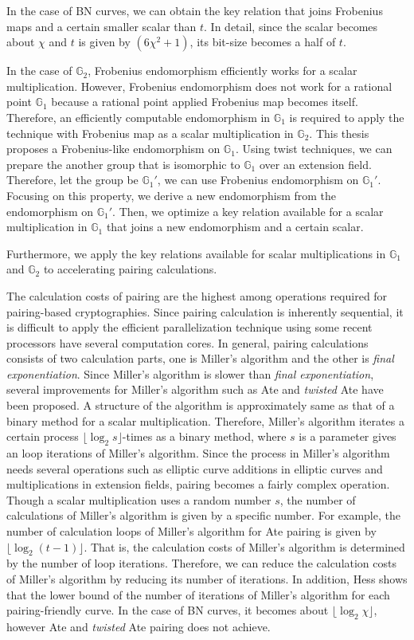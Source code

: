 In the case of BN curves, we can obtain the key relation that joins Frobenius maps and a certain smaller scalar than $t$.
In detail, since the scalar becomes about $\chi$ and $t$ is given by $(6\chi^2+1)$, its bit-size becomes a half of $t$.
 
In the case of $\mathbb{G}_2$, Frobenius endomorphism efficiently works for a scalar multiplication.
However, Frobenius endomorphism does not work for a rational point $\mathbb{G}_1$ because a rational point applied Frobenius map becomes itself.
Therefore, an efficiently computable endomorphism in $\mathbb{G}_1$ is required to apply the technique with Frobenius map as a scalar multiplication in $\mathbb{G}_2$.
This thesis proposes a Frobenius-like endomorphism on $\mathbb{G}_1$.
Using twist techniques, we can prepare the another group that is isomorphic to $\mathbb{G}_1$ over an extension field. 
Therefore, let the group be $\mathbb{G}_1'$, we can use Frobenius endomorphism on $\mathbb{G}_1'$.
Focusing on this property, we derive a new endomorphism from the endomorphism on $\mathbb{G}_1'$.
Then, we optimize a key relation available for a scalar multiplication in $\mathbb{G}_1$ that joins a new endomorphism and a certain scalar.
  
Furthermore, we apply the key relations available for scalar multiplications in $\mathbb{G}_1$ and $\mathbb{G}_2$ to accelerating pairing calculations.

The calculation costs of pairing are the highest among operations required for pairing-based cryptographies.
Since pairing calculation is inherently sequential, it is difficult to apply the efficient parallelization technique using some recent processors have several computation cores.
In general, pairing calculations consists of two calculation parts, one is Miller's algorithm and the other is {\it final exponentiation}.
Since Miller's algorithm is slower than {\it final exponentiation}, several improvements for Miller's algorithm such as Ate and {\it twisted} Ate have been proposed.
A structure of the algorithm is approximately same as that of a binary method for a scalar multiplication.
Therefore, Miller's algorithm iterates a certain process $\lfloor \log_2 s \rfloor$-times as a binary method, where $s$ is a parameter gives an loop iterations of Miller's algorithm.
Since the process in Miller's algorithm needs several operations such as elliptic curve additions in elliptic curves and multiplications in extension fields, pairing becomes a fairly complex operation. 
Though a scalar multiplication uses a random number $s$, the number of calculations of Miller's algorithm is given by a specific number.
For example, the number of calculation loops of Miller's algorithm for Ate pairing is given by $\lfloor \log_2 (t-1) \rfloor$.
That is, the calculation costs of Miller's algorithm is determined by the number of loop iterations.
Therefore, we can reduce the calculation costs of Miller's algorithm by reducing its number of iterations.
In addition, Hess shows that the lower bound of the number of iterations of Miller's algorithm for each pairing-friendly curve.
In the case of BN curves, it becomes about $\lfloor \log_2 \chi \rfloor$, however Ate and {\it twisted} Ate pairing does not achieve.
  
